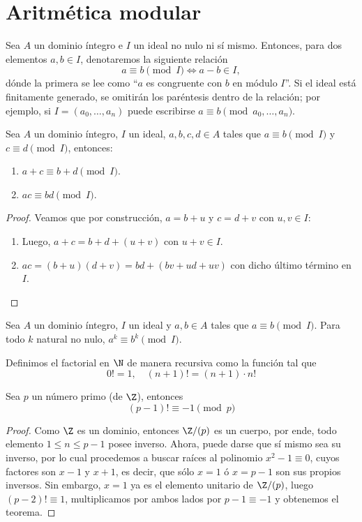 \documentclass[11pt,oneside]{book}
\begin{document}
\section{Aritmética modular}
\begin{mydef}
Sea $A$ un dominio íntegro e $I$ un ideal no nulo ni sí mismo. Entonces, para dos elementos $a,b\in I$, denotaremos la siguiente relación
$$a\equiv b\pmod{I}\iff a-b\in I,$$ 
dónde la primera se lee como ``$a$ es congruente con $b$ en módulo $I$''. Si el ideal está finitamente generado, se omitirán los paréntesis dentro de la relación; por ejemplo, si $I=(a_0,\dots,a_n)$ puede escribirse $a\equiv b\pmod{a_0,\dots,a_n}$.
\end{mydef}
\begin{thm}
Sea $A$ un dominio íntegro, $I$ un ideal, $a,b,c,d\in A$ tales que $a\equiv b\pmod I$ y $c\equiv d\pmod I$, entonces:
\begin{enumerate}[$a)$]
\item $a+c\equiv b+d\pmod I$.
\item $ac\equiv bd\pmod I$.
\end{enumerate}
\end{thm}
\begin{proof}
Veamos que por construcción, $a=b+u$ y $c=d+v$ con $u,v\in I$:
\begin{enumerate}[$a)$]
	\item Luego, $a+c=b+d+(u+v)$ con $u+v\in I$.
	\item $ac=(b+u)(d+v)=bd+(bv+ud+uv)$ con dicho último término en $I$.
\end{enumerate}
\end{proof}
\begin{cor}
Sea $A$ un dominio íntegro, $I$ un ideal y $a,b\in A$ tales que $a\equiv b\pmod I$. Para todo $k$ natural no nulo, $a^k\equiv b^k\pmod I$.
\end{cor}
\begin{mydef}[Factorial]
Definimos el factorial en $\N$ de manera recursiva como la función tal que
$$0!=1,\quad (n+1)!=(n+1)\cdot n!$$
\end{mydef}
\begin{thm}
Sea $p$ un número primo (de $\Z$), entonces
$$(p-1)!\equiv -1\pmod{p}$$
\end{thm}
\begin{proof}
Como $\Z$ es un dominio, entonces $\Z/(p)$ es un cuerpo, por ende, todo elemento $1\leq n\leq p-1$ posee inverso. Ahora, puede darse que sí mismo sea su inverso, por lo cual procedemos a buscar raíces al polinomio $x^2-1\equiv 0$, cuyos factores son $x-1$ y $x+1$, es decir, que sólo $x=1$ ó $x=p-1$ son sus propios inversos. Sin embargo, $x=1$ ya es el elemento unitario de $\Z/(p)$, luego $(p-2)!\equiv 1$, multiplicamos por ambos lados por $p-1\equiv -1$ y obtenemos el teorema.
\end{proof}
\end{document}
